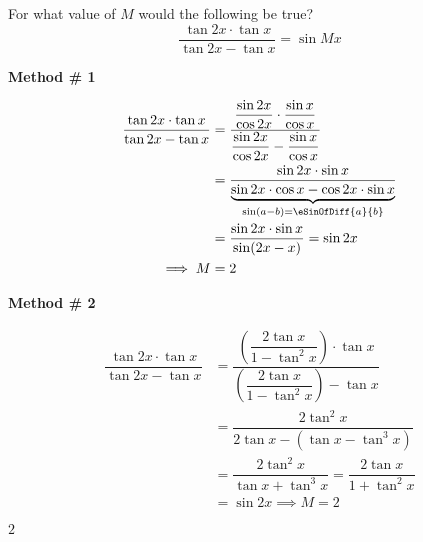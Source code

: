 

\question[3] For what value of $M$ would the following be true? 
\[ \dfrac{\tan 2x\cdot\tan x}{\tan 2x - \tan x} = \sin Mx \] 

\ifprintanswers
\fi 

\begin{solution}[\halfpage]
  \textbf{Method \# 1}

  \begin{align}
    \dfrac{\tan 2x\cdot \tan x}{\tan 2x-\tan x} &= 
    \dfrac{\dfrac{\sin 2x}{\cos 2x}\cdot\dfrac{\sin x}{\cos x}}{\dfrac{\sin 2x}{\cos 2x}-\dfrac{\sin x}{\cos x}} \\
    &= \dfrac{\sin 2x\cdot \sin x}{\underbrace{\sin 2x\cdot\cos x - \cos 2x\cdot\sin x}_{\sin(a-b)=\eSinOfDiff{a}{b}}} \\
    &= \dfrac{\sin 2x\cdot\sin x}{\sin (2x-x)} = \sin 2x \\
    \implies M &= 2
  \end{align}

  \textbf{Method \# 2}

	\begin{align}
    \dfrac{\tan 2x\cdot \tan x}{\tan 2x-\tan x} &= 
    \dfrac{\left(\dfrac{2\tan x}{1-\tan^2 x} \right)\cdot \tan x}{\left(\dfrac{2\tan x}{1-\tan^2 x}\right)-\tan x} \\
    &= \dfrac{2\tan^2 x}{2\tan x - (\tan x -\tan^3 x)} \\
    &= \dfrac{2\tan^2 x}{\tan x + \tan^3 x} = \dfrac{2\tan x}{1 + \tan^2 x} \\
    &= \sin 2x \implies M = 2
	\end{align}
\end{solution}
\ifprintanswers\begin{codex}$2$\end{codex}\fi
